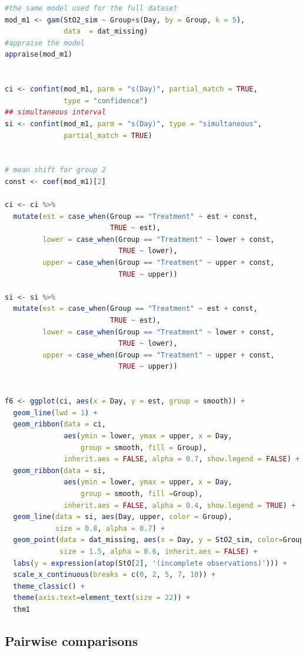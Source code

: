 \documentclass[
]{article}
\begin{document}
\begin{lstlisting}[language=R]
#the same model used for the full dataset
mod_m1 <- gam(StO2_sim ~ Group+s(Day, by = Group, k = 5), 
              data  = dat_missing)
#appraise the model
appraise(mod_m1)


ci <- confint(mod_m1, parm = "s(Day)", partial_match = TRUE,
              type = "confidence")
## simultaneous interval
si <- confint(mod_m1, parm = "s(Day)", type = "simultaneous",
              partial_match = TRUE)


# mean shift for group 2
const <- coef(mod_m1)[2]

ci <- ci %>%
  mutate(est = case_when(Group == "Treatment" ~ est + const,
                         TRUE ~ est),
         lower = case_when(Group == "Treatment" ~ lower + const,
                           TRUE ~ lower),
         upper = case_when(Group == "Treatment" ~ upper + const,
                           TRUE ~ upper))

si <- si %>%
  mutate(est = case_when(Group == "Treatment" ~ est + const,
                         TRUE ~ est),
         lower = case_when(Group == "Treatment" ~ lower + const,
                           TRUE ~ lower),
         upper = case_when(Group == "Treatment" ~ upper + const,
                           TRUE ~ upper))


f6 <- ggplot(ci, aes(x = Day, y = est, group = smooth)) +
  geom_line(lwd = 1) +
  geom_ribbon(data = ci, 
              aes(ymin = lower, ymax = upper, x = Day, 
                  group = smooth, fill = Group),
              inherit.aes = FALSE, alpha = 0.7, show.legend = FALSE) +
  geom_ribbon(data = si,
              aes(ymin = lower, ymax = upper, x = Day, 
                  group = smooth, fill =Group),
              inherit.aes = FALSE, alpha = 0.4, show.legend = TRUE) +
  geom_line(data = si, aes(Day, upper, color = Group), 
            size = 0.8, alpha = 0.7) +
  geom_point(data = dat_missing, aes(x = Day, y = StO2_sim, color=Group), 
             size = 1.5, alpha = 0.6, inherit.aes = FALSE) +
  labs(y = expression(atop(StO[2], '(incomplete observations)'))) +
  scale_x_continuous(breaks = c(0, 2, 5, 7, 10)) +
  theme_classic() +
  theme(axis.text=element_text(size = 22)) +
  thm1
\end{lstlisting}

\hypertarget{pairwise-comparisons}{%
\subsection{Pairwise comparisons}\label{pairwise-comparisons}}
\end{document}
